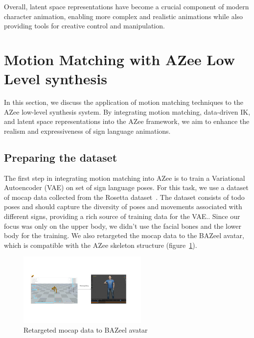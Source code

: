 \documentclass[../../main.tex]{subfiles}
\begin{document}
Overall, latent space representations have become a crucial component of modern character animation, enabling more complex and realistic animations while also providing tools for creative control and manipulation.

\section{Motion Matching with AZee Low Level synthesis}
\label{ch:motion_matching:motion_matching_with_azee}

In this section, we discuss the application of motion matching techniques to the AZee low-level synthesis system. By integrating motion matching, data-driven IK, and latent space representations into the AZee framework, we aim to enhance the realism and expressiveness of sign language animations.

\subsection{Preparing the dataset}
\label{ch:motion_matching:motion_matching_with_azee:dataset}

The first step in integrating motion matching into AZee is to train a Variational Autoencoder (VAE) on set of sign language poses. For this task, we use a dataset of mocap data collected from the Rosetta dataset~\cite{bertin2022rosetta}. The dataset consists of todo poses and should capture the diversity of poses and movements associated with different signs, providing a rich source of training data for the VAE.. Since our focus was only on the upper body, we didn't use the facial bones and the lower body for the training. We also retargeted the mocap data to the BAZeel avatar, which is compatible with the AZee skeleton structure (figure~\ref{fig:retargeted}).

\begin{figure}
  \centering \includegraphics[width = 2.5in]{chapters/motion_matching/images/retargeted.png}
  \caption{Retargeted mocap data to BAZeel avatar}
  \label{fig:retargeted}
\end{figure}
\end{document}
